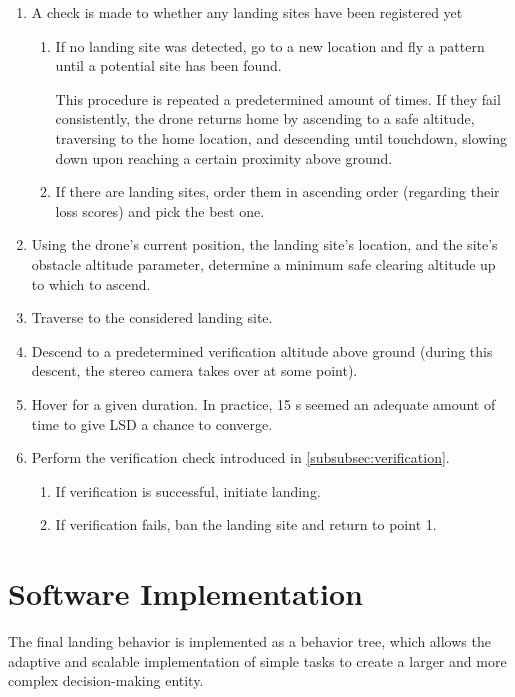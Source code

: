 \begin{enumerate}
    \item A check is made to whether any landing sites have been registered yet
    \begin{enumerate}
        \item If no landing site was detected, go to a new location and fly a pattern until a potential site has been found.

        This procedure is repeated a predetermined amount of times. If they fail consistently, the drone returns home by ascending to a safe altitude, traversing to the home location, and descending until touchdown, slowing down upon reaching a certain proximity above ground.
        \item If there are landing sites, order them in ascending order (regarding their loss scores) and pick the best one.
    \end{enumerate}
    \item Using the drone's current position, the landing site's location, and the site's obstacle altitude parameter, determine a minimum safe clearing altitude up to which to ascend.
    \item Traverse to the considered landing site.
    \item Descend to a predetermined verification altitude above ground (during this descent, the stereo camera takes over at some point).
    \item Hover for a given duration. In practice, 15 s seemed an adequate amount of time to give LSD a chance to converge.
    \item Perform the verification check introduced in \cref{subsubsec:verification}.
    \begin{enumerate}
        \item If verification is successful, initiate landing.
        \item If verification fails, ban the landing site and return to point 1.
    \end{enumerate}
\end{enumerate}

\section{Software Implementation}\label{sec:landing_impl}

The final landing behavior is implemented as a behavior tree, which allows the adaptive and scalable implementation of simple tasks to create a larger and more complex decision-making entity.

